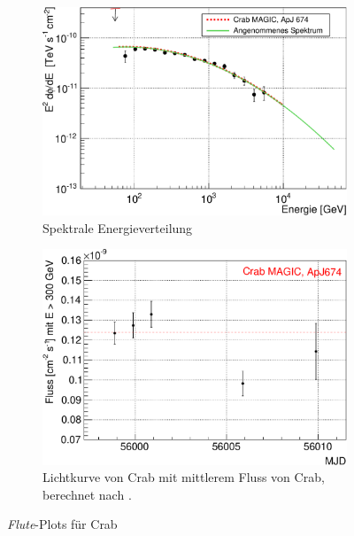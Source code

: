 \begin{figure}
\begin{subfigure}{0.45\linewidth}
  \end{subfigure}
  \hfill
  \begin{subfigure}{0.45\linewidth}
  \includegraphics[width=\textwidth]{./Plots/04_MrkAnalyse/Datenset2/Crab_SED.pdf}
  \caption{Spektrale Energieverteilung}
  \label{Datenset2_SED_Crab}
  \end{subfigure}
  \hfill
  \begin{subfigure}{0.45\linewidth}
  \includegraphics[width=\textwidth]{./Plots/04_MrkAnalyse/Datenset2/Crab_LC.pdf}
  \caption{Lichtkurve von Crab mit mittlerem Fluss von Crab, berechnet nach \cite{LiteraturreferenzMAGIC}.}
  \label{Datenset2_LC_Crab}
  \end{subfigure}
  \hfill
\caption{\textit{Flute}-Plots für Crab}
\label{Datenset2_Flute_Plots_Crab}
\end{figure}


